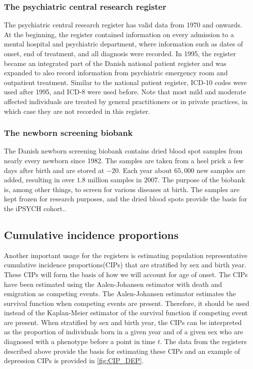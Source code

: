 \subsubsection{The psychiatric central research register}
The psychiatric central research register has valid data from 1970 and onwards. At the beginning, the register contained information on every admission to a mental hospital and psychiatric department, where information such as dates of onset, end of treatment, and all diagnosis were recorded. In 1995, the register became an integrated part of the Danish national patient register and was expanded to also record information from psychiatric emergency room and outpatient treatment. Similar to the national patient register, ICD-10 codes were used after 1995, and ICD-8 were used before. Note that most mild and moderate affected individuals are treated by general practitioners or in private practices, in which case they are not recorded in this register.\cite{mors2011danish}


\subsubsection{The newborn screening biobank}
The Danish newborn screening biobank contains dried blood spot samples from 
nearly every newborn since 1982. The samples are taken from a heel prick a few 
days after birth and are stored at $ -20 $\textcelsius. Each year about $ 
65,000 $ new samples are added, resulting in over $ 1.8 $ million samples in $ 
2007 $. The purpose of the biobank is, among other things, to screen for 
various diseases at birth. The samples are kept frozen for research purposes, 
and the dried blood spots provide the basis for the iPSYCH cohort.\cite{norgaard2007storage}.

\subsection{Cumulative incidence proportions} \label{sec:CIPs}
Another important usage for the registers is estimating population 
representative cumulative incidence proportions(CIPs) that are stratified by 
sex and birth year. These CIPs will form the basis of how we will account for 
age of onset. The CIPs have been estimated using the Aalen-Johansen 
estimator\cite{hansen2017estimating} with death and emigration as competing 
events. The Aalen-Johansen estimator estimates the survival function when 
competing events are present. Therefore, it should be used instead of the 
Kaplan-Meier estimator of the survival function if competing event are present. 
When stratified by sex and birth year, the CIPs can be interpreted as the 
proportion of individuals born in a given year and of a given sex who are 
diagnosed with a phenotype before a point in time $ t $. The data from the 
registers described above provide the basis for estimating these CIPs and an 
example of depression CIPs is provided in \cref{fig:CIP_DEP}.


